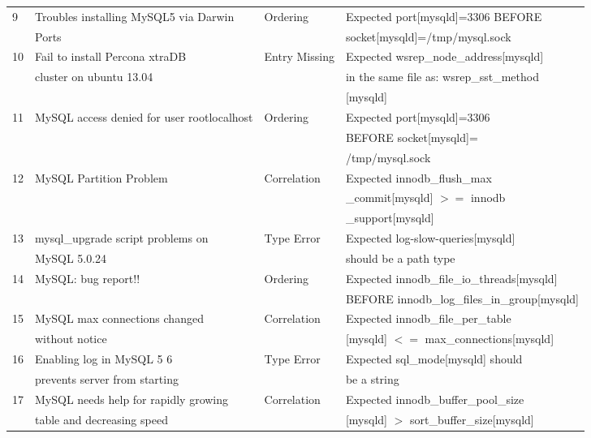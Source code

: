 \begin{table*}[tbp]
\begin{small}
\begin{tabular}{|l|l|l|l|}
9 & Troubles installing MySQL5 via  Darwin 
& Ordering
& Expected port[mysqld]=3306 BEFORE \\ & Ports
&&  socket[mysqld]=/tmp/mysql.sock \\ \hline

10 & Fail to install Percona xtraDB 
& Entry Missing
& Expected wsrep\_node\_address[mysqld] \\ & cluster on ubuntu 13.04
&&  in the same file as: wsrep\_sst\_method \\ &&& [mysqld] \\ \hline

11 & MySQL access denied for user rootlocalhost 
& Ordering
& Expected port[mysqld]=3306  \\ & &&   BEFORE socket[mysqld]= \\ &&& /tmp/mysql.sock
\\ \hline

12 & MySQL Partition Problem
& Correlation
& Expected innodb\_flush\_max  \\ & &&  \_commit[mysqld] $>=$ innodb \\ &&&  \_support[mysqld] \\ \hline

13 & mysql\_upgrade script problems on 
& Type Error
& Expected log-slow-queries[mysqld]  \\ & MySQL 5.0.24 
&&  should be a path type\\ \hline


14 & MySQL: bug report!!
& Ordering
& Expected innodb\_file\_io\_threads[mysqld]  \\ & 
&& BEFORE innodb\_log\_files\_in\_group[mysqld]\\ \hline

15 & MySQL max connections changed 
& Correlation
& Expected innodb\_file\_per\_table \\ & without notice
&&  [mysqld] $<=$ max\_connections[mysqld]  \\ \hline

16 & Enabling log in MySQL 5 6 
& Type Error
& Expected sql\_mode[mysqld] should  \\ & prevents server from starting
&&  be a string \\ \hline

17 & MySQL needs help for rapidly growing 
& Correlation
& Expected innodb\_buffer\_pool\_size \\ & table and decreasing speed
&&  [mysqld] $>$ sort\_buffer\_size[mysqld] \\ \hline


\end{tabular}
\end{small}
\end{table*}
